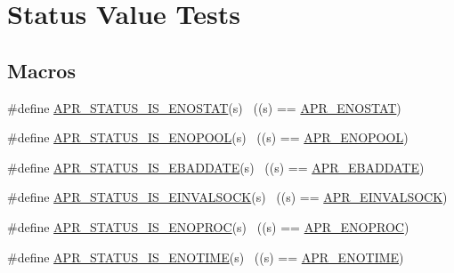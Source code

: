 \hypertarget{group___a_p_r___s_t_a_t_u_s___i_s}{}\section{Status Value Tests}
\label{group___a_p_r___s_t_a_t_u_s___i_s}
\subsection*{Macros}
\begin{DoxyCompactItemize}
\item 
\#define \hyperlink{group___a_p_r___s_t_a_t_u_s___i_s_ga0cb15725cd4f48f474688c601114d447}{A\+P\+R\+\_\+\+S\+T\+A\+T\+U\+S\+\_\+\+I\+S\+\_\+\+E\+N\+O\+S\+T\+AT}(s)            ~((s) == \hyperlink{group___a_p_r___error_ga7995805cf68be1fb16f684c544e45fbe}{A\+P\+R\+\_\+\+E\+N\+O\+S\+T\+AT})
\item 
\#define \hyperlink{group___a_p_r___s_t_a_t_u_s___i_s_gada4306243ac7bb7f8dce01765a660bf6}{A\+P\+R\+\_\+\+S\+T\+A\+T\+U\+S\+\_\+\+I\+S\+\_\+\+E\+N\+O\+P\+O\+OL}(s)            ~((s) == \hyperlink{group___a_p_r___error_gaa8461873202e5e0b4c0ea261e05b07a9}{A\+P\+R\+\_\+\+E\+N\+O\+P\+O\+OL})
\item 
\#define \hyperlink{group___a_p_r___s_t_a_t_u_s___i_s_gab1b413746f4aae5ff891774f4948fcf6}{A\+P\+R\+\_\+\+S\+T\+A\+T\+U\+S\+\_\+\+I\+S\+\_\+\+E\+B\+A\+D\+D\+A\+TE}(s)          ~((s) == \hyperlink{group___a_p_r___error_ga7911720c540a929cc08a2c25e606b56e}{A\+P\+R\+\_\+\+E\+B\+A\+D\+D\+A\+TE})
\item 
\#define \hyperlink{group___a_p_r___s_t_a_t_u_s___i_s_gae2f8d3d1d43b5418ed57143d2b4566a4}{A\+P\+R\+\_\+\+S\+T\+A\+T\+U\+S\+\_\+\+I\+S\+\_\+\+E\+I\+N\+V\+A\+L\+S\+O\+CK}(s)      ~((s) == \hyperlink{group___a_p_r___error_ga548032b79ce0671d9986db0654858812}{A\+P\+R\+\_\+\+E\+I\+N\+V\+A\+L\+S\+O\+CK})
\item 
\#define \hyperlink{group___a_p_r___s_t_a_t_u_s___i_s_ga08394d8e2ebaa1a8de0be315783181ba}{A\+P\+R\+\_\+\+S\+T\+A\+T\+U\+S\+\_\+\+I\+S\+\_\+\+E\+N\+O\+P\+R\+OC}(s)            ~((s) == \hyperlink{group___a_p_r___error_ga18aa6d4ebaefda39478649c20bbeb9df}{A\+P\+R\+\_\+\+E\+N\+O\+P\+R\+OC})
\item 
\#define \hyperlink{group___a_p_r___s_t_a_t_u_s___i_s_ga20db5878fa686620b975f67734035406}{A\+P\+R\+\_\+\+S\+T\+A\+T\+U\+S\+\_\+\+I\+S\+\_\+\+E\+N\+O\+T\+I\+ME}(s)            ~((s) == \hyperlink{group___a_p_r___error_ga7acfb436774a21ae93ff5c1b89e7c4f5}{A\+P\+R\+\_\+\+E\+N\+O\+T\+I\+ME})
\item 

\end{DoxyCompactItemize}
